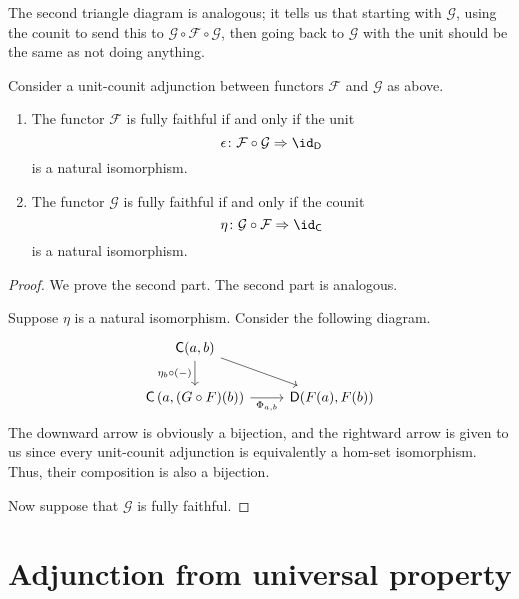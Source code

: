 \documentclass[main.tex]{subfiles}
\begin{document}
The second triangle diagram is analogous; it tells us that starting with $\mathcal{G}$, using the counit to send this to $\mathcal{G} \circ \mathcal{F} \circ \mathcal{G}$, then going back to $\mathcal{G}$ with the unit should be the same as not doing anything.

\begin{proposition}
  Consider a unit-counit adjunction between functors $\mathcal{F}$ and $\mathcal{G}$ as above.
  \begin{enumerate}
    \item The functor $\mathcal{F}$ is fully faithful if and only if the unit
      \begin{equation*}
        \epsilon\colon \mathcal{F} \circ \mathcal{G} \Rightarrow \id_{\mathsf{D}}
      \end{equation*}
      is a natural isomorphism.

    \item The functor $\mathcal{G}$ is fully faithful if and only if the counit
      \begin{equation*}
        \eta\colon \mathcal{G} \circ \mathcal{F} \Rightarrow \id_{\mathsf{C}}
      \end{equation*}
      is a natural isomorphism.
  \end{enumerate}
\end{proposition}
\begin{proof}
  We prove the second part. The second part is analogous.

  Suppose $\eta$ is a natural isomorphism. Consider the following diagram.
  \begin{equation*}
    \begin{tikzcd}
      \mathsf{C}(a, b)
      \arrow[d, swap, "\eta_{b} \circ (-)"]
      \arrow[rd]
      \\
      \mathsf{C}\left(a, (G \circ F)(b)\right)
      \arrow[r, swap, "\Phi_{a,b}"]
      & \mathsf{D}(F(a), F(b))
    \end{tikzcd}
  \end{equation*}
  The downward arrow is obviously a bijection, and the rightward arrow is given to us since every unit-counit adjunction is equivalently a hom-set isomorphism. Thus, their composition is also a bijection.

  Now suppose that $\mathcal{G}$ is fully faithful.
\end{proof}

\section{Adjunction from universal property}
\label{sec:adjunction_from_universal_property}
\end{document}
